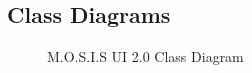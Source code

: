 \subsection{Class Diagrams}
\begin{figure}[ht!]
	\caption{M.O.S.I.S UI 2.0 Class Diagram}
\end{figure}